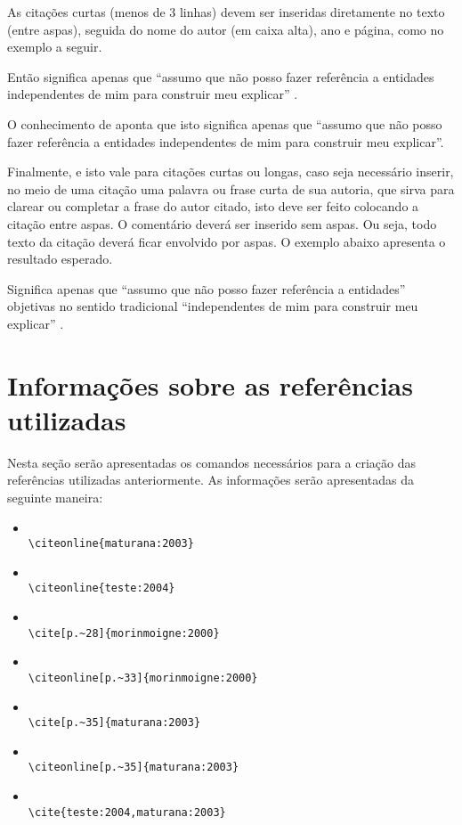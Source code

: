 As citações curtas (menos de 3 linhas) devem ser inseridas diretamente no texto (entre aspas), seguida do nome do autor (em caixa alta), ano e página, como no exemplo a seguir.

Então significa apenas que ``assumo que não posso fazer referência a entidades independentes de mim para construir meu explicar'' \cite[p.~35]{maturana:2003}.

O conhecimento de  aponta que isto significa apenas que ``assumo que não posso fazer referência a entidades independentes de mim para construir meu explicar''.

Finalmente, e isto vale para citações curtas ou longas, caso seja necessário inserir, no meio de uma citação uma palavra ou frase curta de sua autoria, que sirva para clarear ou completar a frase do autor citado, isto deve ser feito colocando a citação entre aspas.
O comentário deverá ser inserido sem aspas.
Ou seja, todo texto da citação deverá ficar envolvido por aspas.
O exemplo abaixo apresenta o resultado esperado.

Significa apenas que ``assumo que não posso fazer referência a entidades'' objetivas no sentido tradicional ``independentes de mim para construir meu explicar'' {}.

\section{Informações sobre as referências utilizadas}\label{referenciasUtilizadas}

Nesta seção serão apresentadas os comandos necessários para a criação das referências utilizadas anteriormente.
As informações serão apresentadas da seguinte maneira:

\begin{itemize}
    \item {}\\ \verb|\citeonline{maturana:2003}|
    \item {}\\ \verb|\citeonline{teste:2004}|
    \item \cite[p.~28]{morinmoigne:2000}\\ \verb|\cite[p.~28]{morinmoigne:2000}|
    \item {}\\ \verb|\citeonline[p.~33]{morinmoigne:2000}|
    \item \cite[p.~35]{maturana:2003}\\ \verb|\cite[p.~35]{maturana:2003}|
    \item {}\\ \verb|\citeonline[p.~35]{maturana:2003}|
    \item \cite{teste:2004,maturana:2003}\\ \verb|\cite{teste:2004,maturana:2003}|
\end{itemize}
